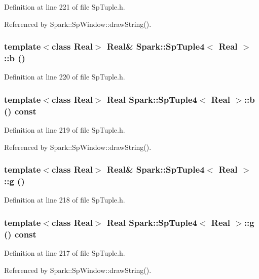 Definition at line 221 of file Sp\-Tuple.h.

Referenced by Spark::Sp\-Window::draw\-String().
\subsubsection{\setlength{\rightskip}{0pt plus 5cm}template$<$class Real$>$ Real\& {\bf Spark::Sp\-Tuple4}$<$ Real $>$::b ()\hspace{0.3cm}{\tt  [inline]}}\label{classSpark_1_1SpTuple4_a15}


Definition at line 220 of file Sp\-Tuple.h.
\subsubsection{\setlength{\rightskip}{0pt plus 5cm}template$<$class Real$>$ Real {\bf Spark::Sp\-Tuple4}$<$ Real $>$::b () const\hspace{0.3cm}{\tt  [inline]}}\label{classSpark_1_1SpTuple4_a14}


Definition at line 219 of file Sp\-Tuple.h.

Referenced by Spark::Sp\-Window::draw\-String().
\subsubsection{\setlength{\rightskip}{0pt plus 5cm}template$<$class Real$>$ Real\& {\bf Spark::Sp\-Tuple4}$<$ Real $>$::g ()\hspace{0.3cm}{\tt  [inline]}}\label{classSpark_1_1SpTuple4_a13}


Definition at line 218 of file Sp\-Tuple.h.
\subsubsection{\setlength{\rightskip}{0pt plus 5cm}template$<$class Real$>$ Real {\bf Spark::Sp\-Tuple4}$<$ Real $>$::g () const\hspace{0.3cm}{\tt  [inline]}}\label{classSpark_1_1SpTuple4_a12}


Definition at line 217 of file Sp\-Tuple.h.

Referenced by Spark::Sp\-Window::draw\-String().
